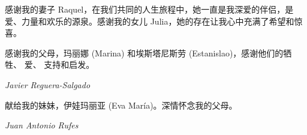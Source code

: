 

感谢我的妻子 Raquel，在我们共同的人生旅程中，她一直是我深爱的伴侣，是爱、力量和欢乐的源泉。感谢我的女儿 Julia，她的存在让我心中充满了希望和惊喜。

感谢我的父母，玛丽娜 (Marina) 和埃斯塔尼斯劳 (Estanislao)，感谢他们的牺牲、 爱、 支持和启发。

\begin{flushright}
\textit{Javier Reguera-Salgado}
\end{flushright}

献给我的妹妹，伊娃玛丽亚 (Eva María)。深情怀念我的父母。

\begin{flushright}
\textit{Juan Antonio Rufes}
\end{flushright}